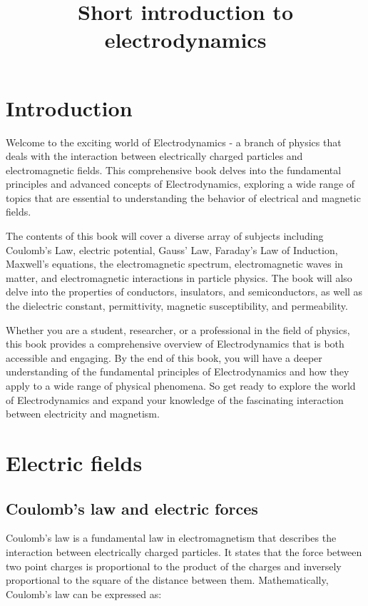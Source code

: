 \documentclass{article}
\title{Short introduction to electrodynamics}
\begin{document}
\maketitle

\tableofcontents

\clearpage

\section{Introduction} %
\label{sec:Introduction}
Welcome to the exciting world of Electrodynamics - a branch of physics that
deals with the interaction between electrically charged particles and
electromagnetic fields. This comprehensive book delves into the fundamental
principles and advanced concepts of Electrodynamics, exploring a wide range of
topics that are essential to understanding the behavior of electrical and
magnetic fields.

The contents of this book will cover a diverse array of subjects including
Coulomb's Law, electric potential, Gauss' Law, Faraday's Law of Induction,
Maxwell's equations, the electromagnetic spectrum, electromagnetic waves in
matter, and electromagnetic interactions in particle physics. The book will
also delve into the properties of conductors, insulators, and semiconductors,
as well as the dielectric constant, permittivity, magnetic susceptibility, and
permeability.

Whether you are a student, researcher, or a professional in the field of
physics, this book provides a comprehensive overview of Electrodynamics that is
both accessible and engaging. By the end of this book, you will have a deeper
understanding of the fundamental principles of Electrodynamics and how they
apply to a wide range of physical phenomena. So get ready to explore the world
of Electrodynamics and expand your knowledge of the fascinating interaction
between electricity and magnetism.


\section{Electric fields} %
\label{sec:Electric fields}
\subsection{Coulomb's law and electric forces} %
\label{ssub:Coulomb's law and electric forces}
Coulomb's law is a fundamental law in electromagnetism that describes the
interaction between electrically charged particles. It states that the force
between two point charges is proportional to the product of the charges and
inversely proportional to the square of the distance between them.
Mathematically, Coulomb's law can be expressed as:
\end{document}
